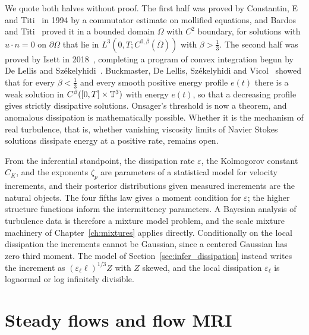 We quote both halves without proof. The first half was proved by Constantin, E and Titi~\cite{cet1994} in 1994 by a commutator estimate on mollified equations, and Bardos and Titi~\cite{bardostiti2018} proved it in a bounded domain $\Omega$ with $C^2$ boundary, for solutions with $u\cdot n = 0$ on $\partial\Omega$ that lie in $L^3(0,T;C^{0,\beta}(\overline\Omega))$ with $\beta>\frac13$. The second half was proved by Isett in 2018~\cite{isett2018}, completing a program of convex integration begun by De Lellis and Sz\'ekelyhidi~\cite{delellisszekelyhidi2009}. Buckmaster, De Lellis, Sz\'ekelyhidi and Vicol~\cite{bdsv2019} showed that for every $\beta<\frac13$ and every smooth positive energy profile $e(t)$ there is a weak solution in $C^\beta([0,T]\times\mathbb{T}^3)$ with energy $e(t)$, so that a decreasing profile gives strictly dissipative solutions. Onsager's threshold is now a theorem, and anomalous dissipation is mathematically possible. Whether it is the mechanism of real turbulence, that is, whether vanishing viscosity limits of Navier Stokes solutions dissipate energy at a positive rate, remains open.

From the inferential standpoint, the dissipation rate $\varepsilon$, the Kolmogorov constant $C_K$, and the exponents $\zeta_p$ are parameters of a statistical model for velocity increments, and their posterior distributions given measured increments are the natural objects. The four fifths law gives a moment condition for $\varepsilon$; the higher structure functions inform the intermittency parameters. A Bayesian analysis of turbulence data is therefore a mixture model problem, and the scale mixture machinery of Chapter~\ref{ch:mixtures} applies directly. Conditionally on the local dissipation the increments cannot be Gaussian, since a centered Gaussian has zero third moment. The model of Section~\ref{sec:infer_dissipation} instead writes the increment as $(\varepsilon_\ell\ell)^{1/3}Z$ with $Z$ skewed, and the local dissipation $\varepsilon_\ell$ is lognormal or log infinitely divisible.

\section{Steady flows and flow MRI}

